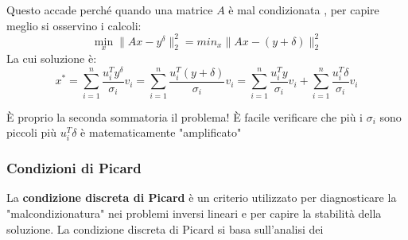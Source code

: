 Questo accade perché quando una matrice $A$ è mal condizionata , per capire meglio si osservino i calcoli:
\[
    \min_x\|Ax - y^\delta\|_2^2 = min_x\|Ax - (y+\delta)\|_2^2     
\]
La cui soluzione è:
\[
    x^*=\sum_{i=1}^{n} \frac{u^T_iy^\delta}{\sigma_i}v_i = \sum_{i=1}^{n} \frac{u^T_i(y+\delta)}{\sigma_i}v_i = \sum_{i=1}^{n} \frac{u^T_iy}{\sigma_i}v_i + \sum_{i=1}^{n} \frac{u^T_i\delta}{\sigma_i}v_i
\]

È proprio la seconda sommatoria il problema! È facile verificare che più i $\sigma_i$ sono piccoli più $u^T_i\delta$ è matematicamente "amplificato"
\subsubsection{Condizioni di Picard}
La \textbf{condizione discreta di Picard} è un criterio utilizzato per diagnosticare la "malcondizionatura" nei problemi inversi lineari e per capire la stabilità della soluzione. La condizione discreta di Picard si basa sull'analisi dei  


